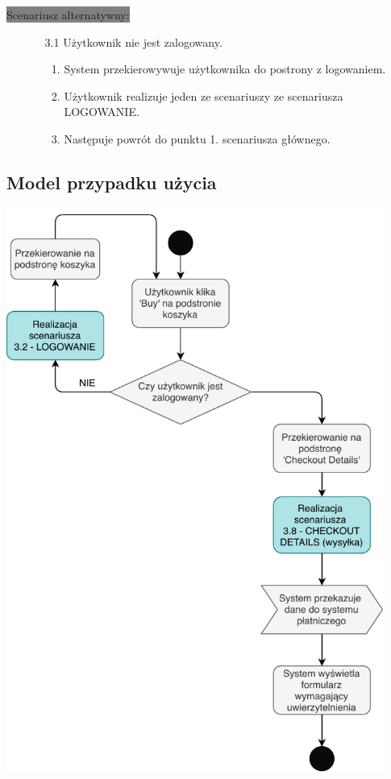 \documentclass[12pt]{report}
\begin{document}
	\colorbox{grey}{Scenariusz alternatywny:}
	\begin{enumerate}\addtocounter{enumi}{6}
		\item[]
		\begin{enumerate}
			\item[3.1] Użytkownik nie jest zalogowany.
			\begin{enumerate}
				\item System przekierowywuje użytkownika do postrony z logowaniem.
				\item Użytkownik realizuje jeden ze scenariuszy ze scenariusza LOGOWANIE.
				\item Następuje powrót do punktu 1. scenariusza głównego.
			\end{enumerate}
		\end{enumerate}
	\end{enumerate}

	\subsection{Model przypadku użycia}
	\begin{center}
		\includegraphics[width=350pt]{zakup.pdf}
	\end{center}
\end{document}
